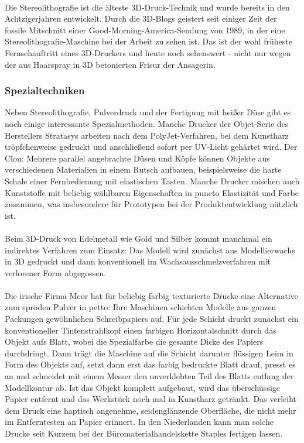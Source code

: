 \\
Die Stereolithografie ist die älteste 3D-Druck-Technik und wurde bereits in den Achtzigerjahren entwickelt. Durch die 3D-Blogs geistert seit einiger Zeit der fossile Mitschnitt einer Good-Morning-America-Sendung von 1989, in der eine Stereolithografie-Maschine bei der Arbeit zu sehen ist. Das ist der wohl früheste Fernsehauftritt eines 3D-Druckers und heute noch sehenswert - nicht nur wegen der aus Haarspray in 3D betonierten Frisur der Ansagerin.

\subsubsection{Spezialtechniken}

Neben Stereolithografie, Pulverdruck und der Fertigung mit heißer Düse gibt es noch einige interessante Spezialmethoden. Manche Drucker der Objet-Serie des Herstellers Stratasys arbeiten nach dem PolyJet-Verfahren, bei dem Kunstharz tröpfchenweise gedruckt und anschließend sofort per UV-Licht gehärtet wird. Der Clou: Mehrere parallel angebrachte Düsen und Köpfe können Objekte aus verschiedenen Materialien in einem Rutsch aufbauen, beispielsweise die harte Schale einer Fernbedienung mit elastischen Tasten. Manche Drucker mischen auch Kunststoffe mit beliebig wählbaren Eigenschaften in puncto Elastizität und Farbe zusammen, was insbesondere für Prototypen bei der Produktentwicklung nützlich ist.\\
\\
Beim 3D-Druck von Edelmetall wie Gold und Silber kommt manchmal ein indirektes Verfahren zum Einsatz: Das Modell wird zunächst aus Modellierwachs in 3D gedruckt und dann konventionell im Wachsausschmelzverfahren mit verlorener Form abgegossen.\\
\\
Die irische Firma Mcor hat für beliebig farbig texturierte Drucke eine Alternative zum spröden Pulver in petto: Ihre Maschinen schichten Modelle aus ganzen Packungen gewöhnlichen Schreibpapiers auf. Für jede Schicht druckt zunächst ein konventioneller Tintenstrahlkopf einen farbigen Horizontalschnitt durch das Objekt aufs Blatt, wobei die Spezialfarbe die gesamte Dicke des Papiers durchdringt. Dann trägt die Maschine auf die Schicht darunter flüssigen Leim in Form des Objekts auf, setzt dann erst das farbig bedruckte Blatt drauf, presst es an und schneidet mit einem Messer den unverklebten Teil des Blatts entlang der Modellkontur ab. Ist das Objekt komplett aufgebaut, wird das überschüssige Papier entfernt und das Werkstück noch mal in Kunstharz getränkt. Das verleiht dem Druck eine haptisch angenehme, seidenglänzende Oberfläche, die nicht mehr im Entferntesten an Papier erinnert. In den Niederlanden kann man solche Drucke seit Kurzem bei der Büromaterialhandelskette Staples fertigen lassen. 